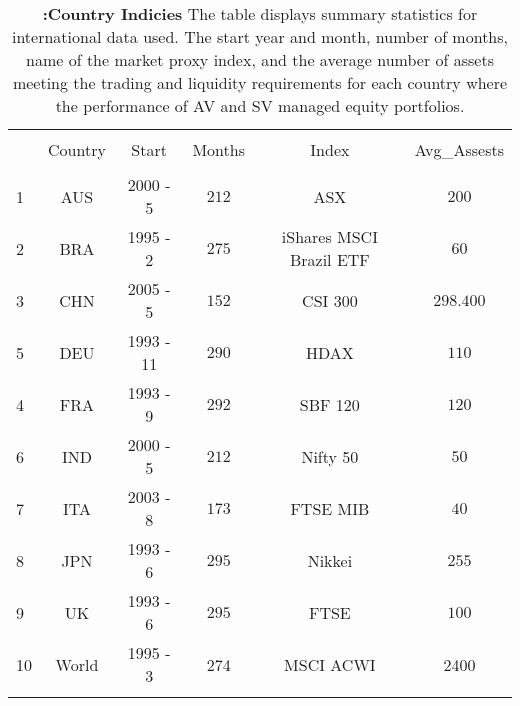 
\begin{table}[!htbp] \centering 
  \centering \caption{\textbf{:Country Indicies} \newline
  	\footnotesize{The table displays summary statistics for international data used. The start year and month, number of months, name of the market proxy index, and the average number of assets meeting the trading and liquidity requirements for each country where the performance of AV and SV managed equity portfolios.}} \vspace{3mm}
  \label{tab:tab_int_summary}
\begin{tabular}{@{\extracolsep{5pt}} Hccccc} 
\\[-1.8ex]\hline 
\hline \\[-1.8ex] 
 & Country & Start & Months & Index & Avg\_Assests \\ 
\hline \\[-1.8ex] 
1 & AUS & 2000 - 5 & $212$& ASX & $200$ \\ 
2 & BRA & 1995 - 2 & $275$& iShares MSCI Brazil ETF& $60$ \\ 
3 & CHN & 2005 - 5 & $152$& CSI 300& $298.400$ \\ 
5 & DEU & 1993 - 11 & $290$& HDAX& $110$ \\
4 & FRA & 1993 - 9 & $292$& SBF 120& $120$ \\ 
6 & IND & 2000 - 5 & $212$& Nifty 50& $50$ \\ 
7 & ITA & 2003 - 8 & $173$& FTSE MIB& $40$ \\ 
8 & JPN & 1993 - 6 & $295$& Nikkei& $255$ \\ 
9 & UK & 1993 - 6 & $295$& FTSE& $100$ \\ 
10 & World & 1995 - 3 & 274 & MSCI ACWI & 2400\\
\hline \\[-1.8ex] 
\end{tabular} 
\end{table} 
